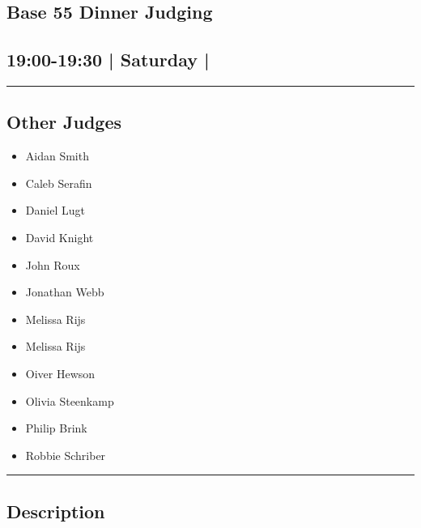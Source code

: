 \documentclass[10pt, A5]{article}
\begin{document}
		\begin{framed}
			\begin{minipage}{\textwidth}

			\setcounter{section}{70}
							\section{\faStar \: Base 55 \faStar \: Dinner Judging}
						
			\subsection*{19:00-19:30 | Saturday | }

			\vspace{0.25cm}
			\hrule
			\vspace{0.25cm}


			\subsection*{Other Judges}
							

				\begin{multicols}{2}

			\begin{itemize}
											\item Aidan Smith
											\item Caleb Serafin
											\item Daniel Lugt
											\item David Knight
											\item John Roux
											\item Jonathan Webb
											\item Melissa Rijs
								\end{itemize}

			\vfill\null
			\columnbreak

			\begin{itemize}
											\item Melissa Rijs
											\item Oiver Hewson
											\item Olivia Steenkamp
											\item Philip Brink
											\item Robbie Schriber
								\end{itemize}

			\vfill\null

			\end{multicols}

			\vspace{0.25cm}
			\hrule
			\vspace{0.25cm}

			\begin{minipage}{\textwidth}
			\subsection*{\faListAlt \: Description}
			
			\end{minipage}


	\end{minipage}
	\end{framed}
\end{document}
